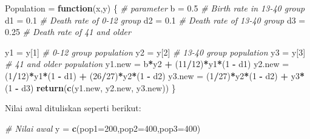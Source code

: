 \documentclass[
]{book}
\newenvironment{Shaded}{\begin{snugshade}}{\end{snugshade}}
\newcommand{\AttributeTok}[1]{\textcolor[rgb]{0.13,0.29,0.53}{#1}}
\newcommand{\CommentTok}[1]{\textcolor[rgb]{0.56,0.35,0.01}{\textit{#1}}}
\newcommand{\ControlFlowTok}[1]{\textcolor[rgb]{0.13,0.29,0.53}{\textbf{#1}}}
\newcommand{\DecValTok}[1]{\textcolor[rgb]{0.00,0.00,0.81}{#1}}
\newcommand{\FloatTok}[1]{\textcolor[rgb]{0.00,0.00,0.81}{#1}}
\newcommand{\FunctionTok}[1]{\textcolor[rgb]{0.13,0.29,0.53}{\textbf{#1}}}
\newcommand{\NormalTok}[1]{#1}
\newcommand{\OtherTok}[1]{\textcolor[rgb]{0.56,0.35,0.01}{#1}}
\newcommand{\SpecialCharTok}[1]{\textcolor[rgb]{0.81,0.36,0.00}{\textbf{#1}}}
\theoremstyle{definition}
\theoremstyle{definition}
\theoremstyle{definition}
\theoremstyle{definition}
\theoremstyle{remark}
\begin{document}
\begin{Shaded}
\begin{Highlighting}[]
\NormalTok{Population }\OtherTok{=} \ControlFlowTok{function}\NormalTok{(x,y) \{}
   \CommentTok{\# parameter}
\NormalTok{   b }\OtherTok{=} \FloatTok{0.5} \CommentTok{\# Birth rate in 13{-}40 group}
\NormalTok{   d1 }\OtherTok{=} \FloatTok{0.1} \CommentTok{\# Death rate of 0{-}12 group}
\NormalTok{   d2 }\OtherTok{=} \FloatTok{0.1} \CommentTok{\# Death rate of 13{-}40 group}
\NormalTok{   d3 }\OtherTok{=} \FloatTok{0.25} \CommentTok{\# Death rate of 41 and older}
   
\NormalTok{   y1 }\OtherTok{=}\NormalTok{ y[}\DecValTok{1}\NormalTok{] }\CommentTok{\# 0{-}12 group population}
\NormalTok{   y2 }\OtherTok{=}\NormalTok{ y[}\DecValTok{2}\NormalTok{] }\CommentTok{\# 13{-}40 group population}
\NormalTok{   y3 }\OtherTok{=}\NormalTok{ y[}\DecValTok{3}\NormalTok{] }\CommentTok{\# 41 and older population}
\NormalTok{   y1.new }\OtherTok{=}\NormalTok{ b}\SpecialCharTok{*}\NormalTok{y2 }\SpecialCharTok{+}\NormalTok{ (}\DecValTok{11}\SpecialCharTok{/}\DecValTok{12}\NormalTok{)}\SpecialCharTok{*}\NormalTok{y1}\SpecialCharTok{*}\NormalTok{(}\DecValTok{1} \SpecialCharTok{{-}}\NormalTok{ d1)}
\NormalTok{   y2.new }\OtherTok{=}\NormalTok{ (}\DecValTok{1}\SpecialCharTok{/}\DecValTok{12}\NormalTok{)}\SpecialCharTok{*}\NormalTok{y1}\SpecialCharTok{*}\NormalTok{(}\DecValTok{1} \SpecialCharTok{{-}}\NormalTok{ d1) }\SpecialCharTok{+}\NormalTok{ (}\DecValTok{26}\SpecialCharTok{/}\DecValTok{27}\NormalTok{)}\SpecialCharTok{*}\NormalTok{y2}\SpecialCharTok{*}\NormalTok{(}\DecValTok{1} \SpecialCharTok{{-}}\NormalTok{ d2)}
\NormalTok{   y3.new }\OtherTok{=}\NormalTok{ (}\DecValTok{1}\SpecialCharTok{/}\DecValTok{27}\NormalTok{)}\SpecialCharTok{*}\NormalTok{y2}\SpecialCharTok{*}\NormalTok{(}\DecValTok{1} \SpecialCharTok{{-}}\NormalTok{ d2) }\SpecialCharTok{+}\NormalTok{ y3}\SpecialCharTok{*}\NormalTok{(}\DecValTok{1} \SpecialCharTok{{-}}\NormalTok{ d3)}
   \FunctionTok{return}\NormalTok{(}\FunctionTok{c}\NormalTok{(y1.new, y2.new, y3.new))}
\NormalTok{\}}
\end{Highlighting}
\end{Shaded}

Nilai awal dituliskan seperti berikut:

\begin{Shaded}
\begin{Highlighting}[]
\CommentTok{\# Nilai awal}
\NormalTok{y }\OtherTok{=} \FunctionTok{c}\NormalTok{(}\AttributeTok{pop1=}\DecValTok{200}\NormalTok{,}\AttributeTok{pop2=}\DecValTok{400}\NormalTok{,}\AttributeTok{pop3=}\DecValTok{400}\NormalTok{)}
\end{Highlighting}
\end{Shaded}
\end{document}
